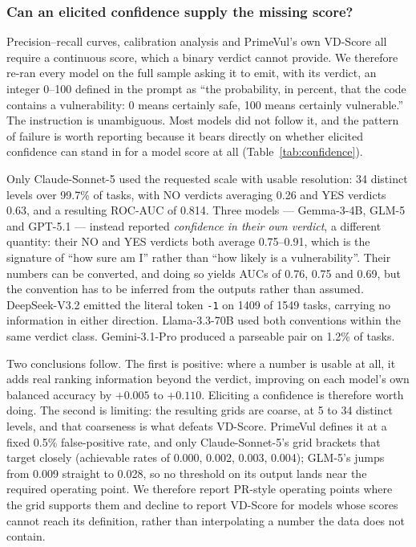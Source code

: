 \documentclass[computers,article,submit,moreauthors]{Definitions/mdpi}
\begin{document}
\subsubsection*{Can an elicited confidence supply the missing score?}
Precision--recall curves, calibration analysis and PrimeVul's own VD-Score all require a continuous score, which a binary verdict cannot provide. We therefore re-ran every model on the full sample asking it to emit, with its verdict, an integer 0--100 defined in the prompt as ``the probability, in percent, that the code contains a vulnerability: 0 means certainly safe, 100 means certainly vulnerable.'' The instruction is unambiguous. Most models did not follow it, and the pattern of failure is worth reporting because it bears directly on whether elicited confidence can stand in for a model score at all (Table~\ref{tab:confidence}).

Only Claude-Sonnet-5 used the requested scale with usable resolution: 34 distinct levels over 99.7\% of tasks, with NO verdicts averaging 0.26 and YES verdicts 0.63, and a resulting ROC-AUC of 0.814. Three models --- Gemma-3-4B, GLM-5 and GPT-5.1 --- instead reported \emph{confidence in their own verdict}, a different quantity: their NO and YES verdicts both average 0.75--0.91, which is the signature of ``how sure am I'' rather than ``how likely is a vulnerability''. Their numbers can be converted, and doing so yields AUCs of 0.76, 0.75 and 0.69, but the convention has to be inferred from the outputs rather than assumed. DeepSeek-V3.2 emitted the literal token \texttt{-1} on 1409 of 1549 tasks, carrying no information in either direction. Llama-3.3-70B used both conventions within the same verdict class. Gemini-3.1-Pro produced a parseable pair on 1.2\% of tasks.

Two conclusions follow. The first is positive: where a number is usable at all, it adds real ranking information beyond the verdict, improving on each model's own balanced accuracy by $+0.005$ to $+0.110$. Eliciting a confidence is therefore worth doing. The second is limiting: the resulting grids are coarse, at 5 to 34 distinct levels, and that coarseness is what defeats VD-Score. PrimeVul defines it at a fixed 0.5\% false-positive rate, and only Claude-Sonnet-5's grid brackets that target closely (achievable rates of 0.000, 0.002, 0.003, 0.004); GLM-5's jumps from 0.009 straight to 0.028, so no threshold on its output lands near the required operating point. We therefore report PR-style operating points where the grid supports them and decline to report VD-Score for models whose scores cannot reach its definition, rather than interpolating a number the data does not contain.
\end{document}
